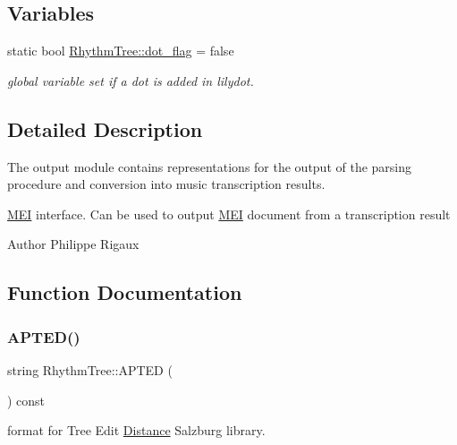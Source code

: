 \subsection*{Variables}
\begin{DoxyCompactItemize}
\item 
\mbox{\label{group__output_ga774fcd89afe324f01efa6514626dd1cb}} 
static bool \mbox{\hyperlink{group__output_ga774fcd89afe324f01efa6514626dd1cb}{Rhythm\+Tree\+::dot\+\_\+flag}} = false
\begin{DoxyCompactList}\small\item\em global variable set if a dot is added in lilydot. \end{DoxyCompactList}\end{DoxyCompactItemize}


\subsection{Detailed Description}
The {\ttfamily output} module contains representations for the output of the parsing procedure and conversion into music transcription results. 

\mbox{\hyperlink{classMEI}{M\+EI}} interface. Can be used to output \mbox{\hyperlink{classMEI}{M\+EI}} document from a transcription result

\begin{DoxyAuthor}{Author}
Philippe Rigaux 
\end{DoxyAuthor}


\subsection{Function Documentation}
\mbox{\label{group__output_ga2c194b384127267b8cfed2c41e70d338}} 
\subsubsection{\texorpdfstring{APTED()}{APTED()}}
{\footnotesize\ttfamily string Rhythm\+Tree\+::\+A\+P\+T\+ED (\begin{DoxyParamCaption}{ }\end{DoxyParamCaption}) const}



format for Tree Edit \mbox{\hyperlink{classDistance}{Distance}} Salzburg library. 

